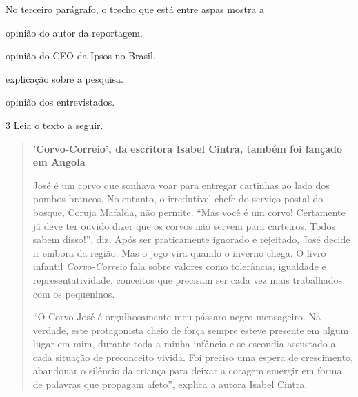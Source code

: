 No terceiro parágrafo, o trecho que está entre aspas mostra a

\begin{escolha}
\item opinião do autor da reportagem.

\item opinião do CEO da Ipsos no Brasil.

\item explicação sobre a pesquisa.

\item opinião dos entrevistados.
\end{escolha}


\num{3} Leia o texto a seguir.

\begin{quote}
\textbf{'Corvo-Correio', da escritora Isabel Cintra, também foi lançado 
em Angola}

José é um corvo que sonhava voar para entregar cartinhas ao lado dos
pombos brancos. No entanto, o irredutível chefe do serviço postal do
bosque, Coruja Mafalda, não permite. ``Mas você é um corvo! Certamente já
deve ter ouvido dizer que os corvos não servem para carteiros. Todos
sabem disso!'', diz. Após ser praticamente ignorado e rejeitado, José
decide ir embora da região. Mas o jogo vira quando o inverno chega. O
livro infantil \textit{Corvo-Correio} fala sobre valores como tolerância,
igualdade e representatividade, conceitos que precisam ser cada vez mais
trabalhados com os pequeninos.

``O Corvo José é orgulhosamente meu pássaro negro mensageiro. Na
verdade, este protagonista cheio de força sempre esteve presente em
algum lugar em mim, durante toda a minha infância e se escondia
assustado a cada situação de preconceito vivida. Foi preciso uma espera
de crescimento, abandonar o silêncio da criança para deixar a coragem
emergir em forma de palavras que propagam afeto'', explica a autora
Isabel Cintra.

\end{quote}

